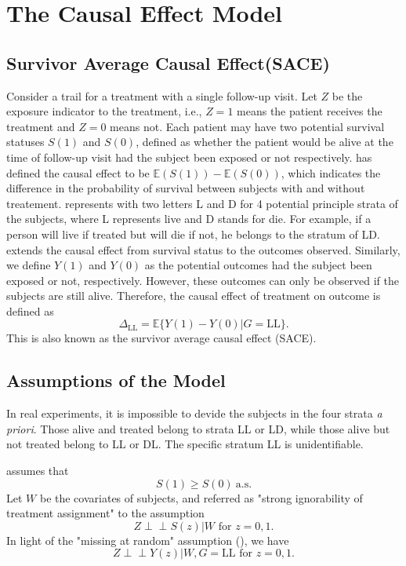 \documentclass[article]{jss}
\def\ci{\perp\!\!\!\perp}
\begin{document}
\section{The Causal Effect Model} \label{sec:model}
\subsection{Survivor Average Causal Effect(SACE)}

Consider a trail for a treatment with a single follow-up visit. Let $Z$ be the exposure indicator to the treatment, i.e., $Z=1$ means the patient receives the treatment and $Z=0$ means not. Each patient may have two potential survival statuses $S(1)$ and $S(0)$, defined as whether the patient would be alive at the time of follow-up visit had the subject been exposed or not respectively. \cite{Hernan265} has defined the causal effect to be $\mathbb{E}(S(1))-\mathbb{E}(S(0))$, which indicates the difference in the probability of survival between subjects with and without treatement. \cite{rubin2006} represents with two letters L and D for 4 potential principle strata of the subjects, where L represents live and D stands for die. For example, if a person will live if treated but will die if not, he belongs to the stratum of LD. \cite{rubin2006} extends the causal effect from survival status to the outcomes observed. Similarly, we define $Y(1)$ and $Y(0)$ as the potential outcomes had the subject been exposed or not, respectively. However, these outcomes can only be observed if the subjects are still alive. Therefore, the causal effect of treatment on outcome is defined as
%
\begin{equation}
  \Delta_\text{LL} = \mathbb{E}\{Y(1)-Y(0)|G=\text{LL}\}.
  \label{eqn:sace}
\end{equation}
%
This is also known as the survivor average causal effect (SACE).

\subsection{Assumptions of the Model}

In real experiments, it is impossible to devide the subjects in the four strata \emph{a priori}. Those alive and treated belong to strata LL or LD, while those alive but not treated belong to LL or DL. The specific stratum LL is unidentifiable.

\cite{doi:10.1093/biostatistics/kxl027} assumes that
%
\begin{equation}
  S(1) \geq S(0) ~\text{a.s.}
  \label{ass:1}
\end{equation}
%
Let $W$ be the covariates of subjects, and \cite{doi:10.1093/biomet/70.1.41} referred as "strong ignorability of treatment assignment" to the assumption
%
\begin{equation}
  Z\ci S(z)|W\text{ for } z=0,1.
  \label{ass:2}
\end{equation}
%
In light of the "missing at random" assumption (\cite{doi:10.1093/biomet/63.3.581}), we have
%
\begin{equation}
  Z\ci Y(z)|W, G=\text{LL}\text{ for }z=0,1.
  \label{ass:3}
\end{equation}
%
\end{document}

